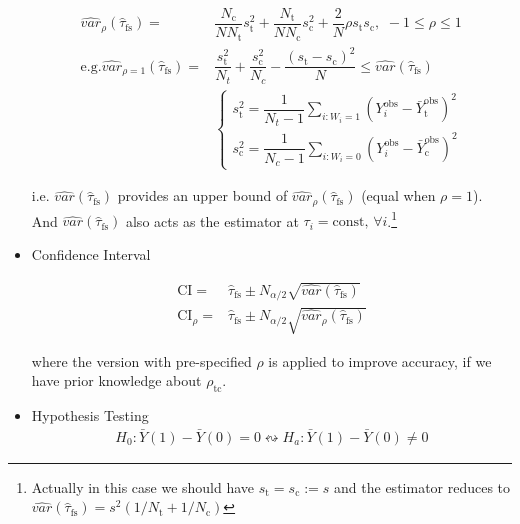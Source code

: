 \begin{itemize}[topsep=2pt,itemsep=0pt]
\begin{align}
        \hat{var}_\rho (\hat{\tau}_\mathrm{fs} )=&\dfrac{N_\mathrm{c} }{NN_\mathrm{t} }s_\mathrm{t} ^2+\dfrac{N_\mathrm{t} }{NN_\mathrm{c} }s_\mathrm{c}^2+\dfrac{2}{N}\rho s_\mathrm{t}s_\mathrm{c},\,\, -1\leq \rho \leq 1 \\
        \mathrm{e.g.}\hat{var}_{\rho =1}(\hat{\tau}_\mathrm{fs} )=& \dfrac{s^2_\mathrm{t} }{N_t}+\dfrac{s^2_\mathrm{c} }{N_c}-\dfrac{(s_\mathrm{t}-s_\mathrm{c}  )^2}{N}\leq \hat{var}(\hat{\tau}_\mathrm{fs} )\\ 
        &\begin{cases}
            s^2_\mathrm{t}=\dfrac{1}{N_t-1}\sum_{i:W_i=1}\left(Y_i^\mathrm{obs} -\bar{Y}^\mathrm{obs}_\mathrm{t}  \right)^2 \\
            s^2_\mathrm{c}=\dfrac{1}{N_c-1}\sum_{i:W_i=0}\left(Y_i^\mathrm{obs} -\bar{Y}^\mathrm{obs}_\mathrm{c}  \right)^2
        \end{cases}
    \end{align}

    i.e. $ \hat{var}(\hat{\tau}_\mathrm{fs} ) $ provides an upper bound of $ \hat{var}_\rho (\hat{\tau}_\mathrm{fs} ) $ (equal when $ \rho =1 $). And $  \hat{var}(\hat{\tau}_\mathrm{fs} )  $ also acts as the estimator at $ \tau_i=\mathrm{const},\,\forall i $.\footnote{Actually in this case we should have $ s_\mathrm{t}=s_\mathrm{c}:=s    $ and the estimator reduces to $ \hat{var}(\hat{\tau}_\mathrm{fs} )=s^2(1/N_\mathrm{t}+1/N_\mathrm{c}  ) $}

    
    
    \item Confidence Interval
    
    \begin{align}
        \mathrm{CI}=&  \hat{\tau}_\mathrm{fs}\pm N_{\alpha /2}\sqrt{\hat{var}(\hat{\tau}_\mathrm{fs} )}  \\
        \mathrm{CI}_\rho =&  \hat{\tau}_\mathrm{fs}\pm N_{\alpha /2}\sqrt{\hat{var}_\rho (\hat{\tau}_\mathrm{fs} )}  
    \end{align}
    
    where the version with pre-specified $ \rho  $ is applied to improve accuracy, if we have prior knowledge about $ \rho_\mathrm{tc}   $. 
    
    \item Hypothesis Testing
    \begin{align}
        H_0:\bar{Y}(1)-\bar{Y}(0)=0\leftrightsquigarrow H_a: \bar{Y}(1)-\bar{Y}(0)\neq 0
    \end{align}


\end{itemize}
